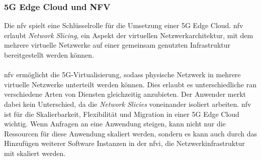 \documentclass[runningheads]{llncs}
\numberwithin{figure}{section}
\begin{document}
\subsubsection{5G Edge Cloud und NFV}
Die \acrlong{nfv} spielt eine Schlüsselrolle für die Umsetzung einer 5G Edge Cloud.
\acrshort{nfv} erlaubt \textit{Network Slicing}, ein Aspekt der virtuellen Netzwerkarchitektur, 
mit dem mehrere virtuelle Netzwerke auf einer gemeinsam genutzten Infrastruktur bereitgestellt werden können.
\\
\\
\acrshort{nfv} ermöglicht die 5G-Virtualisierung, sodass physische Netzwerk in mehrere virtuelle Netzwerke unterteilt werden können. 
Dies erlaubt es unterschiedliche \acrfull{ran} verschiedene Arten von Diensten gleichzeitig anzubieten. 
Der Anwender merkt dabei kein Unterschied, da die \textit{Network Slicies} voneinander isoliert arbeiten. 
\acrshort{nfv} ist für die Skalierbarkeit, Flexibilität und Migration in einer 5G Edge Cloud wichtig. Wenn Anfragen an eine
Anwendung steigen, kann nicht nur die Ressourcen für diese Anwendung skaliert werden, sondern es kann auch durch das Hinzufügen weiterer
Software Instanzen in der \acrfull{nfvi}, die Netzwerkinfrastruktur mit skaliert werden. \cite{How5GNFV} 
\end{document}
